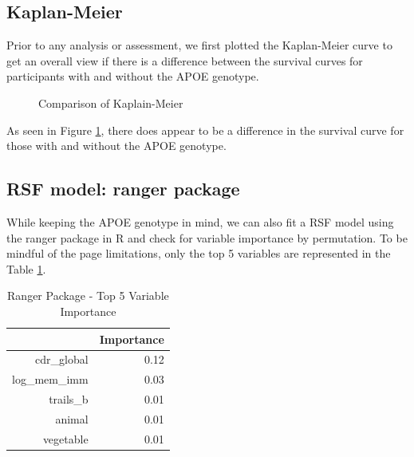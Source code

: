 \documentclass[a4paper,man,natbib,11pt]{article}
\begin{document}
\subsection{Kaplan-Meier}

Prior to any analysis or assessment, we first plotted the Kaplan-Meier curve to get an overall view if there is a difference between the survival curves for participants with and without the APOE genotype. 

\begin{figure}[h!]%
    \centering
    \qquad
    \caption{Comparison of Kaplain-Meier}%
    \label{fig:KM}%
\end{figure}

As seen in Figure \ref{fig:KM}, there does appear to be a difference in the survival curve for those with and without the APOE genotype.

\subsection{RSF model: ranger package}

While keeping the APOE genotype in mind, we can also fit a RSF model using the ranger package in R and check for variable importance by permutation. To be mindful of the page limitations, only the top 5 variables are represented in the Table \ref{ranger_vi}. 

\begin{table}[ht]
\centering
\caption{Ranger Package - Top 5 Variable Importance}
\begin{tabular}{rr}
  \hline
 & Importance \\ 
  \hline
cdr\_global & 0.12 \\ 
  log\_mem\_imm & 0.03 \\ 
  trails\_b & 0.01 \\ 
  animal & 0.01 \\ 
  vegetable & 0.01 \\ 
   \hline
\end{tabular}
\label{ranger_vi}
\end{table}
\end{document}
